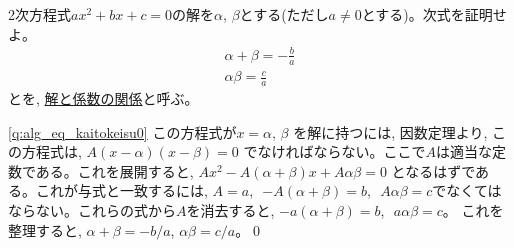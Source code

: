 \begin{q}\label{q:alg_eq_kaitokeisu0} 
2次方程式$ax^2+bx+c=0$の解を$\alpha$, $\beta$とする(ただし$a\neq0$とする)。次式を証明せよ。
\begin{eqnarray}
\alpha+\beta=-\frac{b}{a}\label{eq:alg_eq_kaitokeisu1}\\
\alpha\beta=\frac{c}{a}\label{eq:alg_eq_kaitokeisu2}
\end{eqnarray}
とを, 
\underline{解と係数の関係}と呼ぶ。
\end{q}
\vv
{}\ref{q:alg_eq_kaitokeisu0} この方程式が$x=\alpha,\,\beta$
を解に持つには, 因数定理より, この方程式は, $A(x-\alpha)(x-\beta)=0$
でなければならない。ここで$A$は適当な定数である。これを展開すると, 
$Ax^2-A(\alpha+\beta)x+A\alpha\beta=0$
となるはずである。これが与式と一致するには, 
$A=a$,\,\, $-A(\alpha+\beta)=b$,\,\, $A\alpha\beta=c$でなくては
ならない。これらの式から$A$を消去すると, $-a(\alpha+\beta)=b$,\,\, $a\alpha\beta=c$。
これを整理すると, $\alpha+\beta=-b/a$, $\alpha\beta=c/a$。\qed
\hv


\vv



